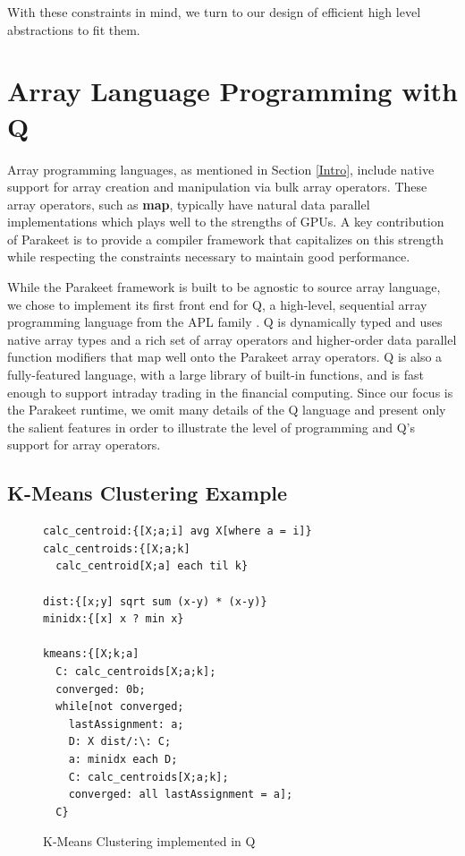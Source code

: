 \documentclass[preprint]{sigplanconf}
\begin{document}
With these constraints in mind, we turn to our design of efficient high level
abstractions to fit them.

\section{Array Language Programming with Q}
\label{Q}
Array programming languages, as mentioned in Section \ref{Intro}, include
native support for array creation and manipulation via bulk array operators.
These array operators, such as \textbf{map}, typically have natural data
parallel implementations which plays well to the strengths of GPUs.  A key
contribution of Parakeet is to provide a compiler framework that capitalizes on
this strength while respecting the constraints necessary to maintain good
performance.

While the Parakeet framework is built to be agnostic to source
array language, we chose to implement its first front end for Q, a high-level,
sequential array programming language from the APL family \cite{Borr08}.
Q is dynamically typed and uses
native array types and a rich set of array operators and higher-order
data parallel function modifiers that map well onto the Parakeet array
operators. Q is also a fully-featured language, with a large library of built-in
functions, and is fast enough to support
intraday trading in the financial computing. Since our
focus is the Parakeet runtime, we omit many details of the Q language and 
present only the salient features in
order to illustrate the level of programming
and Q's support for array operators.

\subsection{K-Means Clustering Example}
\begin{figure}[h!]
\begin{lstlisting}
calc_centroid:{[X;a;i] avg X[where a = i]}
calc_centroids:{[X;a;k]
  calc_centroid[X;a] each til k}

dist:{[x;y] sqrt sum (x-y) * (x-y)}
minidx:{[x] x ? min x}

kmeans:{[X;k;a]
  C: calc_centroids[X;a;k];
  converged: 0b;
  while[not converged;
    lastAssignment: a;
    D: X dist/:\: C;
    a: minidx each D;
    C: calc_centroids[X;a;k];
    converged: all lastAssignment = a];
  C}
\end{lstlisting}
\caption{K-Means Clustering implemented in Q}
\label{QKMeans}
\end{figure}
\end{document}
